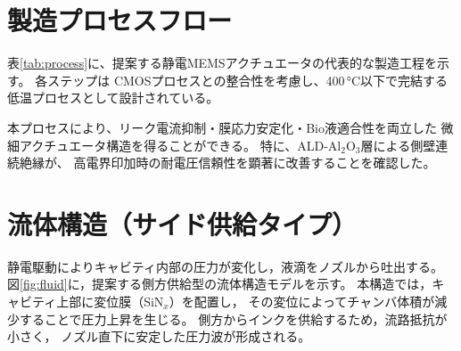 \documentclass[conference]{IEEEtran}
\begin{document}
\section{製造プロセスフロー}
表\ref{tab:process}に、提案する静電MEMSアクチュエータの代表的な製造工程を示す。
各ステップは CMOSプロセスとの整合性を考慮し、400\,°C以下で完結する低温プロセスとして設計されている。

\begin{table}[t]
\centering
\caption{静電MEMSアクチュエータの代表的製造プロセス}
\label{tab:process}
\end{table}

本プロセスにより、リーク電流抑制・膜応力安定化・Bio液適合性を両立した
微細アクチュエータ構造を得ることができる。
特に、ALD-Al$_2$O$_3$層による側壁連続絶縁が、
高電界印加時の耐電圧信頼性を顕著に改善することを確認した。

\section{流体構造（サイド供給タイプ）}
静電駆動によりキャビティ内部の圧力が変化し，液滴をノズルから吐出する。
図\ref{fig:fluid}に，提案する側方供給型の流体構造モデルを示す。
本構造では，キャビティ上部に変位膜（SiN$_x$）を配置し，
その変位によってチャンバ体積が減少することで圧力上昇を生じる。
側方からインクを供給するため，流路抵抗が小さく，
ノズル直下に安定した圧力波が形成される。
\end{document}
